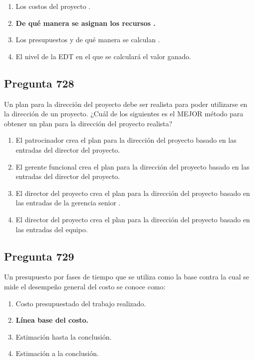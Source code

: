 \documentclass[11pt,a4paper]{article}
\begin{document}
\begin{enumerate}[label=\alph*)]
  \item Los costos del proyecto .
  \item \textbf{De qué manera se asignan los recursos .}
  \item Los presupuestos y de qué manera se calculan .
  \item El nivel de la EDT en el que se calculará el valor ganado.
\end{enumerate}

\subsection*{Pregunta 728}
Un plan para la dirección del proyecto debe ser realista para poder utilizarse en la dirección de un proyecto. ¿Cuál de los siguientes es el MEJOR método para obtener un plan para la dirección del proyecto realista?

\begin{enumerate}[label=\alph*)]
  \item El patrocinador crea el plan para la dirección del proyecto basado en las entradas del director del proyecto.
  \item El gerente funcional crea el plan para la dirección del proyecto basado en las entradas del director del proyecto.
  \item El director del proyecto crea el plan para la dirección del proyecto basado en las entradas de la gerencia senior .
  \item El director del proyecto crea el plan para la dirección del proyecto basado en las entradas del equipo.
\end{enumerate}

\subsection*{Pregunta 729}
Un presupuesto por fases de tiempo que se utiliza como la base contra la cual se mide el desempeño general del costo se conoce como:

\begin{enumerate}[label=\alph*)]
  \item Costo presupuestado del trabajo realizado.
  \item \textbf{Línea base del costo.}
  \item Estimación hasta la conclusión.
  \item Estimación a la conclusión.
\end{enumerate}
\end{document}
